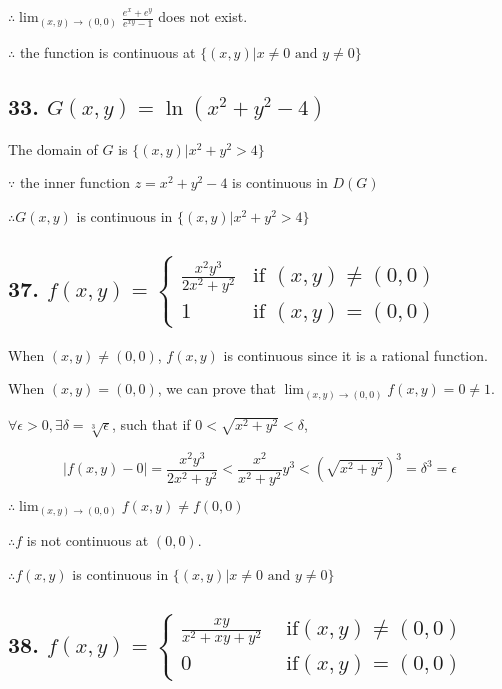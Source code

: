 \documentclass{article}
\begin{document}
    $\therefore \lim_{(x, y) \to (0, 0)}\frac{e^x + e^y}{e^{xy} - 1}$ does not exist.

    $\therefore$ the function is continuous at $\{ (x, y) | x \not = 0 \textrm{ and } y \not = 0 \}$

    \subsection*{33. $G(x, y) = \ln (x^2 + y^2 - 4)$}

    The domain of $G$ is $\{ (x, y) | x^2 + y^2 > 4\}$

    $\because$ the inner function $z = x^2 + y^2 - 4$ is continuous in $D(G)$

    $\therefore G(x, y)$ is continuous in $\{ (x, y) | x^2 + y^2 > 4\}$

    \subsection*{37. $f(x, y) = \left\{ \begin{array}{ll} \frac{x^2y^3}{2x^2 + y^2} &\textrm{if } (x, y) \not = (0, 0) \\ 1 &\textrm{if } (x, y) = (0, 0) \end{array}\right.$}

    When $(x, y) \not = (0, 0)$, $f(x, y)$ is continuous since it is a rational function.

    When $(x, y) = (0, 0)$, we can prove that $\lim_{(x, y) \to (0, 0)} f(x, y) = 0 \not = 1$.

    $\forall \epsilon > 0, \exists \delta = \sqrt[3]{\epsilon}$, such that if $0 < \sqrt{x^2 + y^2} < \delta$,
    
    $$|f(x, y) - 0| = \frac{x^2y^3}{2x^2 + y^2} < \frac{x^2}{x^2 + y^2} y^3 < (\sqrt{x^2 + y^2})^3 = \delta^3 = \epsilon$$

    $\therefore \lim_{(x, y) \to (0, 0)} f(x, y) \not = f(0, 0)$
    
    $\therefore f$ is not continuous at $(0, 0)$.

    $\therefore f(x, y)$ is continuous in $\{  (x, y) | x \not = 0 \textrm{ and } y \not = 0 \}$

    \subsection*{38. $f(x, y) = \left\{ \begin{array}{ll} \frac{xy}{x^2 + xy + y^2} &\textrm{ if} (x, y) \not = (0, 0) \\ 0 &\textrm{ if} (x, y) = (0, 0)\end{array}\right.$}
\end{document}
